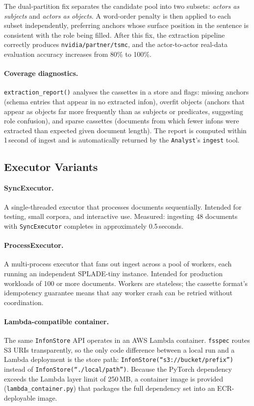 The dual-partition fix separates the candidate pool into two subsets:
\emph{actors as subjects} and \emph{actors as objects}.  A word-order penalty
is then applied to each subset independently, preferring anchors whose surface
position in the sentence is consistent with the role being filled.  After this
fix, the extraction pipeline correctly produces \texttt{nvidia/partner/tsmc},
and the actor-to-actor real-data evaluation accuracy increases from 80\% to
100\%.

\paragraph{Coverage diagnostics.}
\texttt{extraction\_report()} analyses the cassettes in a store and flags:
missing anchors (schema entries that appear in no extracted infon), overfit
objects (anchors that appear as objects far more frequently than as subjects
or predicates, suggesting role confusion), and sparse cassettes (documents
from which fewer infons were extracted than expected given document length).
The report is computed within 1\,second of ingest and is automatically
returned by the \texttt{Analyst}'s \texttt{ingest} tool.

\subsection{Executor Variants}
\label{sec:implementation:executors}

\paragraph{SyncExecutor.}
A single-threaded executor that processes documents sequentially.  Intended
for testing, small corpora, and interactive use.  Measured: ingesting 48
documents with \texttt{SyncExecutor} completes in approximately 0.5\,seconds.

\paragraph{ProcessExecutor.}
A multi-process executor that fans out ingest across a pool of workers, each
running an independent SPLADE-tiny instance.  Intended for production
workloads of 100 or more documents.  Workers are stateless; the cassette
format's idempotency guarantee means that any worker crash can be retried
without coordination.

\paragraph{Lambda-compatible container.}
The same \texttt{InfonStore} API operates in an AWS Lambda container.
\texttt{fsspec} routes S3 URIs transparently, so the only code difference
between a local run and a Lambda deployment is the store path:
\texttt{InfonStore(``s3://bucket/prefix'')} instead of
\texttt{InfonStore(``./local/path'')}.  Because the PyTorch dependency
exceeds the Lambda layer limit of 250\,MB, a container image is provided
(\texttt{lambda\_container.py}) that packages the full dependency set into an
ECR-deployable image.

